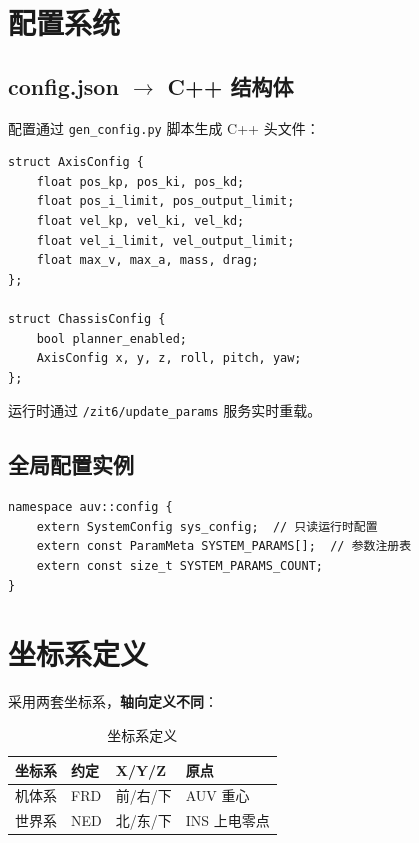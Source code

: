 \documentclass[12pt,a4paper]{article}
\begin{document}
\section{配置系统}

\subsection{config.json $\rightarrow$ C++ 结构体}

配置通过 \texttt{gen\_config.py} 脚本生成 C++ 头文件：

\begin{lstlisting}[caption={配置结构体示例}]
struct AxisConfig {
    float pos_kp, pos_ki, pos_kd;
    float pos_i_limit, pos_output_limit;
    float vel_kp, vel_ki, vel_kd;
    float vel_i_limit, vel_output_limit;
    float max_v, max_a, mass, drag;
};

struct ChassisConfig {
    bool planner_enabled;
    AxisConfig x, y, z, roll, pitch, yaw;
};
\end{lstlisting}

运行时通过 \texttt{/zit6/update\_params} 服务实时重载。

\subsection{全局配置实例}

\begin{lstlisting}[caption={全局配置访问}]
namespace auv::config {
    extern SystemConfig sys_config;  // 只读运行时配置
    extern const ParamMeta SYSTEM_PARAMS[];  // 参数注册表
    extern const size_t SYSTEM_PARAMS_COUNT;
}
\end{lstlisting}

\section{坐标系定义}

采用两套坐标系，\textbf{轴向定义不同}：

\begin{table}[H]
\centering
\begin{tabularx}{\textwidth}{llll}
\toprule
\textbf{坐标系} & \textbf{约定} & \textbf{X/Y/Z} & \textbf{原点} \\
\midrule
机体系 & FRD & 前/右/下 & AUV 重心 \\
世界系 & NED & 北/东/下 & INS 上电零点 \\
\bottomrule
\end{tabularx}
\caption{坐标系定义}
\end{table}
\end{document}
